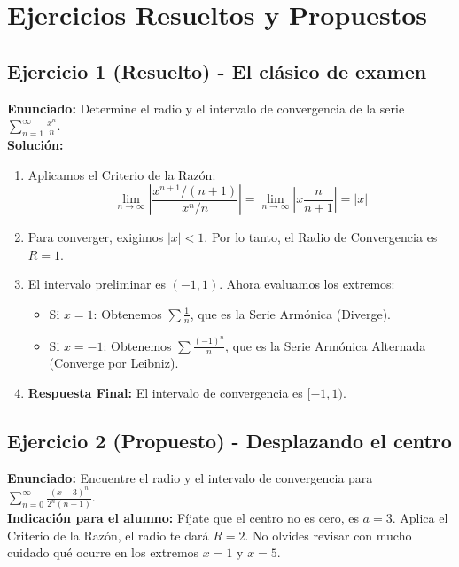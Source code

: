 \documentclass[11pt, a4paper]{article}
\begin{document}
\section{Ejercicios Resueltos y Propuestos}

\subsection*{Ejercicio 1 (Resuelto) - El clásico de examen}
\textbf{Enunciado:} Determine el radio y el intervalo de convergencia de la serie $\sum_{n=1}^{\infty} \frac{x^n}{n}$.\\
\textbf{Solución:}
\begin{enumerate}
    \item Aplicamos el Criterio de la Razón:
    \[ \lim_{n \to \infty} \left| \frac{x^{n+1}/(n+1)}{x^n/n} \right| = \lim_{n \to \infty} \left| x \frac{n}{n+1} \right| = |x| \]
    \item Para converger, exigimos $|x| < 1$. Por lo tanto, el Radio de Convergencia es $R = 1$.
    \item El intervalo preliminar es $(-1, 1)$. Ahora evaluamos los extremos:
    \begin{itemize}
        \item Si $x = 1$: Obtenemos $\sum \frac{1}{n}$, que es la Serie Armónica (Diverge).
        \item Si $x = -1$: Obtenemos $\sum \frac{(-1)^n}{n}$, que es la Serie Armónica Alternada (Converge por Leibniz).
    \end{itemize}
    \item \textbf{Respuesta Final:} El intervalo de convergencia es $[-1, 1)$.
\end{enumerate}

\subsection*{Ejercicio 2 (Propuesto) - Desplazando el centro}
\textbf{Enunciado:} Encuentre el radio y el intervalo de convergencia para $\sum_{n=0}^{\infty} \frac{(x-3)^n}{2^n (n+1)}$.\\
\textbf{Indicación para el alumno:} Fíjate que el centro no es cero, es $a=3$. Aplica el Criterio de la Razón, el radio te dará $R=2$. No olvides revisar con mucho cuidado qué ocurre en los extremos $x=1$ y $x=5$.
\end{document}
